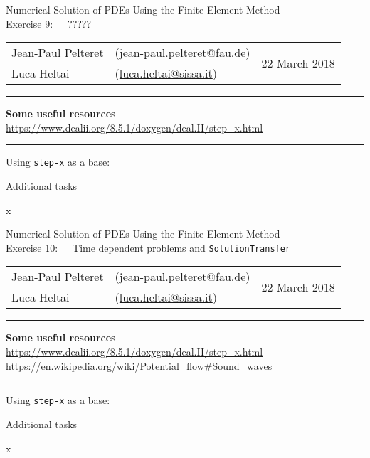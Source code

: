 \documentclass[11pt,answers]{exam}
\makeatletter
\newcommand{\makeheader}[3]{%
\setcounter{question}{0}
\begin{center}
{\sc Numerical Solution of PDEs Using the Finite Element Method}\vspace{2ex}\\
{\sc Exercise #1:\ \ \ #2}\vspace{2ex}\\
\begin{tabular*}{\textwidth}{ll @{\extracolsep{\fill}}r}
Jean-Paul Pelteret & (\url{jean-paul.pelteret@fau.de}) & \multirow{2}{*}{#3} \\
Luca Heltai & (\url{luca.heltai@sissa.it}) & \\
\end{tabular*}
\end{center}
}
\newcommand{\makeresources}[1]{%
\rule{\textwidth}{0.6mm}
\textbf{Some useful resources}\\[1.5ex]
#1 \\
\rule{\textwidth}{0.6mm}
}
\makeatother
\begin{document}
%
%
%
%
%
%




\clearpage
\makeheader{9}{?????}{22 March 2018}
\makeresources{%
\url{https://www.dealii.org/8.5.1/doxygen/deal.II/step_x.html}
}

\begin{questions}

\question Using \verb|step-x| as a base:

\question Additional tasks
\begin{parts}
\bonuspart x
\end{parts}

\end{questions}




\clearpage
\makeheader{10}{Time dependent problems and \texttt{SolutionTransfer}}{22 March 2018}
\makeresources{%
\url{https://www.dealii.org/8.5.1/doxygen/deal.II/step_x.html} \\
\url{https://en.wikipedia.org/wiki/Potential_flow\#Sound_waves}
}

\begin{questions}

\question Using \verb|step-x| as a base:

\question Additional tasks
\begin{parts}
\bonuspart x
\end{parts}

\end{questions}
\end{document}
